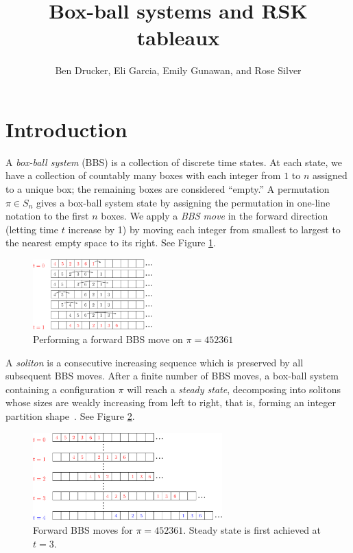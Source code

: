 \documentclass[submission]{FPSAC2021}
\title%
{Box-ball systems and RSK tableaux}
\author[B.~Drucker, E.~Garcia, E.~Gunawan, and R.~Silver]{Ben Drucker\addressmark{1}, Eli Garcia\addressmark{2}, Emily Gunawan\addressmark{3}, and Rose Silver\addressmark{4}
}
\theoremstyle{plain}
\theoremstyle{definition}
\numberwithin{equation}{section}
\begin{document}
\maketitle


\section{Introduction}
    A \emph{box-ball system} (BBS) is a collection of discrete time states. At each state, we have a collection of countably many boxes with each integer from $1$ to $n$ assigned to a unique box; the remaining boxes are considered ``empty.'' A permutation $\pi \in S_n$ gives a box-ball system state by assigning the permutation in one-line notation to the first $n$ boxes. We apply a \emph{BBS move} in the forward direction (letting time $t$ increase by 1) by moving each integer from smallest to largest to the nearest empty space to its right. 
    See Figure \ref{fig: intro to BBS}.
\begin{figure}[H]
    \centering
    \includegraphics[width = 0.41\textwidth]{Step3.eps}
    \caption{Performing a forward BBS move on $\pi=452361$}
    \label{fig: intro to BBS}
\end{figure}

A \emph{soliton} is a consecutive increasing sequence which is preserved by all subsequent BBS moves. After a finite number of BBS moves, a box-ball system containing a configuration $\pi$ will reach a \emph{steady state},  
decomposing into solitons
whose sizes are weakly increasing from left to right, 
that is, forming an integer partition shape~\cite{Takahashi93}. 
See Figure \ref{fig: BBS steady state}.
    \begin{figure}[H]
    \centering
    \includegraphics[width = 0.65\textwidth]{Step4V2.eps}
    \caption{Forward BBS moves for $\pi=452361$. Steady state is first achieved at $t=3.$} 
    \label{fig: BBS steady state}
\end{figure}
\end{document}
